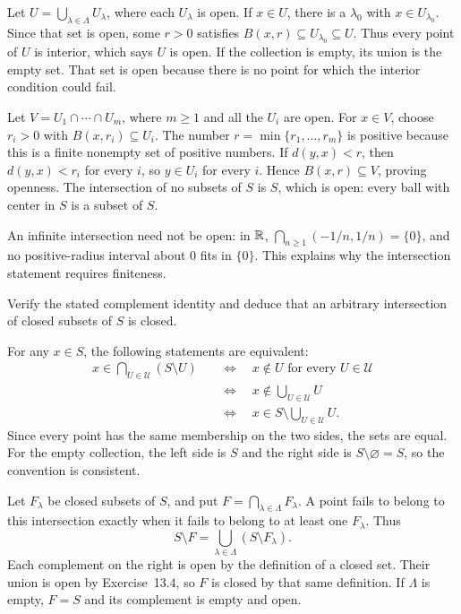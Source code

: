 Let $U=\bigcup_{\lambda\in\Lambda}U_\lambda$, where each
$U_\lambda$ is open. If $x\in U$, there is a $\lambda_0$ with
$x\in U_{\lambda_0}$. Since that set is open, some $r>0$
satisfies $B(x,r)\subseteq U_{\lambda_0}\subseteq U$.
Thus every point of $U$ is interior, which says $U$ is open.
If the collection is empty, its union is the empty set. That set
is open because there is no point for which the interior condition
could fail.

Let $V=U_1\cap\cdots\cap U_m$, where $m\ge1$ and all the
$U_i$ are open. For $x\in V$, choose $r_i>0$ with
$B(x,r_i)\subseteq U_i$. The number
$r=\min\{r_1,\ldots,r_m\}$ is positive because this is a finite
nonempty set of positive numbers. If $d(y,x)<r$, then
$d(y,x)<r_i$ for every $i$, so $y\in U_i$ for every $i$.
Hence $B(x,r)\subseteq V$, proving openness.
The intersection of no subsets of $S$ is $S$, which is open:
every ball with center in $S$ is a subset of $S$.

An infinite intersection need not be open: in $\mathbb{R}$,
$\bigcap_{n\ge1}(-1/n,1/n)=\{0\}$, and no positive-radius
interval about $0$ fits in $\{0\}$. This explains why the
intersection statement requires finiteness.

\goal Verify the stated complement identity and deduce that
an arbitrary intersection of closed subsets of $S$ is closed.

For any $x\in S$, the following statements are equivalent:
\[
 \begin{aligned}
 x\in\bigcap_{U\in\mathcal U}(S\setminus U)
 &\quad\Longleftrightarrow\quad
 x\notin U\text{ for every }U\in\mathcal U\\
 &\quad\Longleftrightarrow\quad
 x\notin\bigcup_{U\in\mathcal U}U\\
 &\quad\Longleftrightarrow\quad
 x\in S\setminus\bigcup_{U\in\mathcal U}U.
 \end{aligned}
\]
Since every point has the same membership on the two sides,
the sets are equal. For the empty collection, the left side is
$S$ and the right side is $S\setminus\varnothing=S$, so the
convention is consistent.

Let $F_\lambda$ be closed subsets of $S$, and put
$F=\bigcap_{\lambda\in\Lambda}F_\lambda$.
A point fails to belong to this intersection exactly when it
fails to belong to at least one $F_\lambda$. Thus
\[
 S\setminus F
 =\bigcup_{\lambda\in\Lambda}(S\setminus F_\lambda).
\]
Each complement on the right is open by the definition of a
closed set. Their union is open by Exercise~13.4, so $F$ is
closed by that same definition. If $\Lambda$ is empty, $F=S$
and its complement is empty and open.


